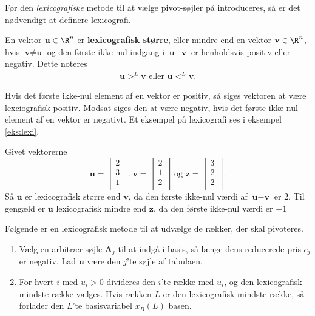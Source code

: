 Før den \textit{lexicografiske} metode til at vælge pivot-søjler på introduceres, så er det nødvendigt at definere lexicografi.
\begin{defn}{}{}
En vektor $\textbf{u}\in \R^n$ er \textbf{lexicografisk større}, eller mindre end en vektor $\textbf{v}\in \R^n$, hvis $\textbf{v} \neq \textbf{u}$ og den første ikke-nul indgang i $\textbf{u}-\textbf{v}$ er henholdsvis positiv eller negativ. Dette noteres
\begin{align*}
\textbf{u} >^L \textbf{v} \text{ eller } \textbf{u} <^L \textbf{v}.
\end{align*} 
\end{defn}
\noindent
Hvis det første ikke-nul element af en vektor er positiv, så siges vektoren at være lexciografisk positiv. Modsat siges den at være negativ, hvis det første ikke-nul element af en vektor er negativt. Et eksempel på lexicografi ses i eksempel \ref{eks:lexi}.
\\
%
\begin{eks}\label{eks:lexi}
Givet vektorerne
$$\textbf{u}=
\begin{bmatrix}
2\\
3\\
1\\
\end{bmatrix}
,
\textbf{v}=
\begin{bmatrix}
2\\
1\\
2\\
\end{bmatrix}
\text{ og }
\textbf{z}=
\begin{bmatrix}
3\\
2\\
2\\
\end{bmatrix}
.$$
Så $\textbf{u}$ er lexicografisk større end $\textbf{v}$, da den første ikke-nul værdi af $\textbf{u}-\textbf{v}$ er $2$.
Til gengæld er $\textbf{u}$ lexicografisk mindre end $\textbf{z}$, da den første ikke-nul værdi er $-1$
\end{eks}
Følgende er en lexicografisk metode til at udvælge de rækker, der skal pivoteres.
\begin{enumerate}
\item Vælg en arbitrær søjle $\textbf{A}_j$ til at indgå i basis, så længe dens reducerede pris $c_j$ er negativ.
Lad $\textbf{u}$ være den $j$'te søjle af tabulaen.
\item For hvert $i$ med $u_i>0$ divideres den $i$'te række med $u_i$, og den lexicografisk mindste række vælges. 
Hvis rækken $L$ er den lexicografisk mindste række, så forlader den $L$'te basisvariabel $x_B(L)$ basen.
\end{enumerate}
